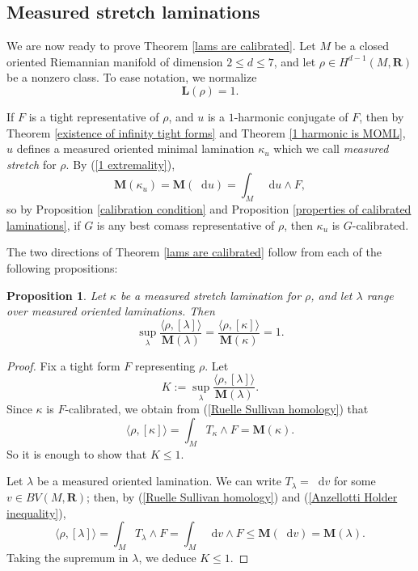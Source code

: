 \documentclass[reqno,11pt]{amsart}
\newcommand{\RR}{\mathbf{R}}
\newcommand*\dif{\mathop{}\!\mathrm{d}}
\newcommand{\Mass}{\mathbf M}
\newcommand{\Comass}{\mathbf L}
\newcommand{\dfn}[1]{\emph{#1}\index{#1}}
\newtheorem{proposition}[theorem]{Proposition}
\theoremstyle{definition}
\numberwithin{equation}{section}
\begin{document}
\subsection{Measured stretch laminations}\label{proof of Theorem B}
We are now ready to prove Theorem \ref{lams are calibrated}.
Let $M$ be a closed oriented Riemannian manifold of dimension $2 \leq d \leq 7$, and let $\rho \in H^{d - 1}(M, \RR)$ be a nonzero class.
To ease notation, we normalize
$$\Comass(\rho) = 1.$$

If $F$ is a tight representative of $\rho$, and $u$ is a $1$-harmonic conjugate of $F$, then by Theorem \ref{existence of infinity tight forms} and Theorem \ref{1 harmonic is MOML}, $u$ defines a measured oriented minimal lamination $\kappa_u$ which we call \dfn{measured stretch} for $\rho$.
By (\ref{1 extremality}),
$$\Mass(\kappa_u) = \Mass(\dif u) = \int_M \dif u \wedge F,$$
so by Proposition \ref{calibration condition} and Proposition \ref{properties of calibrated laminations}, if $G$ is any best comass representative of $\rho$, then $\kappa_u$ is $G$-calibrated.

The two directions of Theorem \ref{lams are calibrated} follow from each of the following propositions:

\begin{proposition}\label{L equals K}
Let $\kappa$ be a measured stretch lamination for $\rho$, and let $\lambda$ range over measured oriented laminations. Then 
	\begin{equation}\label{L equals K formula}
	\sup_\lambda \frac{\langle \rho, [\lambda]\rangle}{\Mass(\lambda)} = \frac{\langle \rho, [\kappa]\rangle}{\Mass(\kappa)} = 1.
	\end{equation}
\end{proposition}
\begin{proof}
Fix a tight form $F$ representing $\rho$.
Let
$$K :=  \sup_\lambda \frac{\langle \rho, [\lambda]\rangle}{\Mass(\lambda)}.$$
Since $\kappa$ is $F$-calibrated, we obtain from (\ref{Ruelle Sullivan homology}) that
$$\langle \rho, [\kappa]\rangle = \int_M T_\kappa \wedge F = \Mass(\kappa).$$
So it is enough to show that $K \leq 1$.

Let $\lambda$ be a measured oriented lamination.
We can write $T_\lambda = \dif v$ for some $v \in BV(M, \RR)$; then, by (\ref{Ruelle Sullivan homology}) and (\ref{Anzellotti Holder inequality}),
$$\langle \rho, [\lambda]\rangle = \int_M T_\lambda \wedge F = \int_M \dif v \wedge F \leq \Mass(\dif v) = \Mass(\lambda).$$
Taking the supremum in $\lambda$, we deduce $K \leq 1$.
\end{proof}
\end{document}
